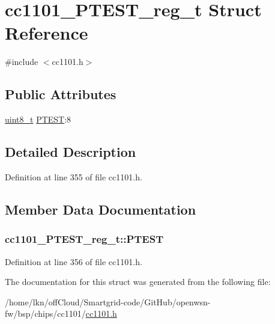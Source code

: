 \hypertarget{structcc1101___p_t_e_s_t__reg__t}{}\section{cc1101\+\_\+\+P\+T\+E\+S\+T\+\_\+reg\+\_\+t Struct Reference}
\label{structcc1101___p_t_e_s_t__reg__t}


{\ttfamily \#include $<$cc1101.\+h$>$}

\subsection*{Public Attributes}
\begin{DoxyCompactItemize}
\item 
\hyperlink{_p_e___types_8h_aba7bc1797add20fe3efdf37ced1182c5}{uint8\+\_\+t} \hyperlink{structcc1101___p_t_e_s_t__reg__t_ad764854ca9888ab61150c2a1765de0ec}{P\+T\+E\+ST}\+:8
\end{DoxyCompactItemize}


\subsection{Detailed Description}


Definition at line 355 of file cc1101.\+h.



\subsection{Member Data Documentation}
\subsubsection[{\texorpdfstring{P\+T\+E\+ST}{PTEST}}]{ cc1101\+\_\+\+P\+T\+E\+S\+T\+\_\+reg\+\_\+t\+::\+P\+T\+E\+ST}\hypertarget{structcc1101___p_t_e_s_t__reg__t_ad764854ca9888ab61150c2a1765de0ec}{}\label{structcc1101___p_t_e_s_t__reg__t_ad764854ca9888ab61150c2a1765de0ec}


Definition at line 356 of file cc1101.\+h.



The documentation for this struct was generated from the following file\+:\begin{DoxyCompactItemize}
\item 
/home/lkn/off\+Cloud/\+Smartgrid-\/code/\+Git\+Hub/openwsn-\/fw/bsp/chips/cc1101/\hyperlink{cc1101_8h}{cc1101.\+h}\end{DoxyCompactItemize}

